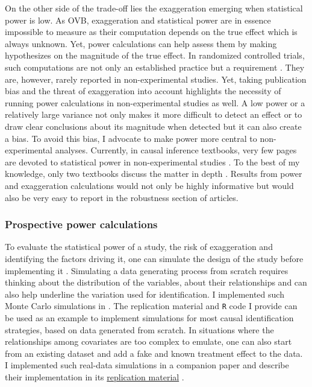 \documentclass[usletter, 12pt]{article}
\begin{document}
			On the other side of the trade-off lies the exaggeration emerging when statistical power is low. As OVB, exaggeration and statistical power are in essence impossible to measure as their computation depends on the true effect which is always unknown. Yet, power calculations can help assess them by making hypothesizes on the magnitude of the true effect. In randomized controlled trials, such computations are not only an established practice but a requirement \citep{duflo_using_2007, mcconnellGoingSimpleSample2015, athey_econometrics_2016}. They are, however, rarely reported in non-experimental studies. %
			Yet, taking publication bias and the threat of exaggeration into account highlights the necessity of running power calculations in non-experimental studies as well. A low power or a relatively large variance not only makes it more difficult to detect an effect or to draw clear conclusions about its magnitude when detected but it can also create a bias. To avoid this bias, I advocate to make power more central to non-experimental analyses. Currently, in causal inference textbooks, very few pages are devoted to statistical power in non-experimental studies \citep{angrist_mostly_2009, angrist_mastering_2014, imbens_causal_2015, cunningham_causal_2021}. To the best of my knowledge, only two textbooks discuss the matter in depth \citep{shadish_experimental_2002, huntington-klein_effect_2021}. Results from power and exaggeration calculations would not only be highly informative but would also be very easy to report in the robustness section of articles. 
			
			\subsubsection{Prospective power calculations}
						
				To evaluate the statistical power of a study, the risk of exaggeration and identifying the factors driving it, one can simulate the design of the study before implementing it \citep{hill_bayesian_2011, gelman_regression_2020, black_simulated_2022}. %
				Simulating a data generating process from scratch requires thinking about the distribution of the variables, about their relationships and can also help underline the variation used for identification. %
			 I implemented such Monte Carlo simulations in . The replication material and \verb?R? code I provide can be used as an example to implement simulations for most causal identification strategies, based on data generated from scratch. In situations where the relationships among covariates are too complex to emulate, one can also start from an existing dataset and add a fake and known treatment effect to the data. I implemented such real-data simulations in a companion paper and describe their implementation in its \href{https://vincentbagilet.github.io/inference_pollution/}{replication material} \citep{bagilet_accurate_2023}. 
			 
\end{document}
